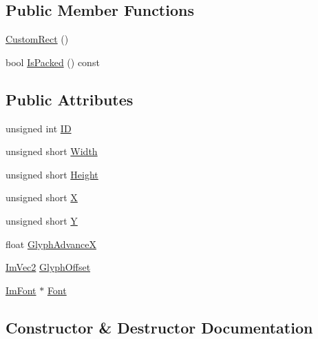 \subsection*{Public Member Functions}
\begin{DoxyCompactItemize}
\item 
\mbox{\hyperlink{struct_im_font_atlas_1_1_custom_rect_abee2845214da5ffc9c77bb388402a0a9}{Custom\+Rect}} ()
\item 
bool \mbox{\hyperlink{struct_im_font_atlas_1_1_custom_rect_ac15602342c8eabbddf559bc84a3e6700}{Is\+Packed}} () const
\end{DoxyCompactItemize}
\subsection*{Public Attributes}
\begin{DoxyCompactItemize}
\item 
unsigned int \mbox{\hyperlink{struct_im_font_atlas_1_1_custom_rect_a1afc9c6d72105e6695fbefa08e086387}{ID}}
\item 
unsigned short \mbox{\hyperlink{struct_im_font_atlas_1_1_custom_rect_a961e02b6cda1eb69dfd2f2d40ae40d5f}{Width}}
\item 
unsigned short \mbox{\hyperlink{struct_im_font_atlas_1_1_custom_rect_a7b423a44d98a6f5695941300906418e5}{Height}}
\item 
unsigned short \mbox{\hyperlink{struct_im_font_atlas_1_1_custom_rect_af080bc8663332dfd5576d9a6a5313089}{X}}
\item 
unsigned short \mbox{\hyperlink{struct_im_font_atlas_1_1_custom_rect_ae1739c480b82fa11ebdd1edb9e3cf5eb}{Y}}
\item 
float \mbox{\hyperlink{struct_im_font_atlas_1_1_custom_rect_afb55b310d9816386f2eb2f11df9f11e2}{Glyph\+AdvanceX}}
\item 
\mbox{\hyperlink{struct_im_vec2}{Im\+Vec2}} \mbox{\hyperlink{struct_im_font_atlas_1_1_custom_rect_a18a84c649c382fafe75eba628b5d599e}{Glyph\+Offset}}
\item 
\mbox{\hyperlink{struct_im_font}{Im\+Font}} $\ast$ \mbox{\hyperlink{struct_im_font_atlas_1_1_custom_rect_aeffa65b37c8d9241e3720472a019aad2}{Font}}
\end{DoxyCompactItemize}


\subsection{Constructor \& Destructor Documentation}
\mbox{\label{struct_im_font_atlas_1_1_custom_rect_abee2845214da5ffc9c77bb388402a0a9}} 
